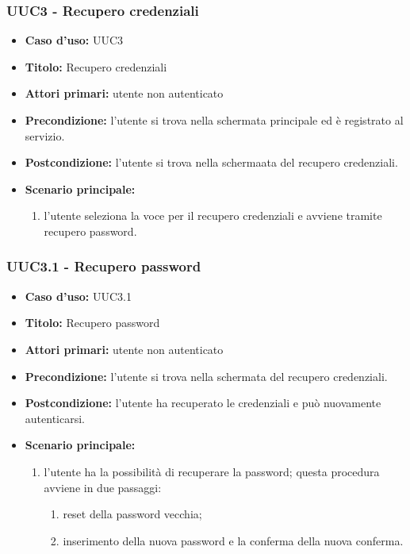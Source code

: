 \documentclass[casi-duso]{subfiles}
\begin{document}
\subsubsection{UUC3 - Recupero credenziali}
\label{subsub:UUC3utente}
\begin{itemize}
  \item \textbf{Caso d’uso:} UUC3 
  \item \textbf{Titolo:} Recupero credenziali
  \item \textbf{Attori primari:} utente non autenticato
  \item \textbf{Precondizione:} l'utente si trova nella schermata principale ed è registrato al servizio.
  \item \textbf{Postcondizione:} l'utente si trova nella schermaata del recupero credenziali.
  \item \textbf{Scenario principale:} 
  \begin{enumerate}
    \item l'utente seleziona la voce per il recupero credenziali e avviene tramite recupero password.
  \end{enumerate} 
\end{itemize}

\subsubsection{UUC3.1 - Recupero password}
\label{subsub:UUC3.1utente}
\begin{itemize}
  \item \textbf{Caso d’uso:} UUC3.1 
  \item \textbf{Titolo:} Recupero password
  \item \textbf{Attori primari:} utente non autenticato
  \item \textbf{Precondizione:} l'utente si trova nella schermata del recupero credenziali.
  \item \textbf{Postcondizione:} l'utente ha recuperato le credenziali e può nuovamente autenticarsi.
  \item \textbf{Scenario principale:} 
  \begin{enumerate}
    \item l'utente ha la possibilità di recuperare la password; questa procedura avviene in due passaggi:
    \begin{enumerate}
      \item reset della password vecchia;
      \item inserimento della nuova password e la conferma della nuova conferma.
    \end{enumerate}
  \end{enumerate} 
\end{itemize}
\end{document}
